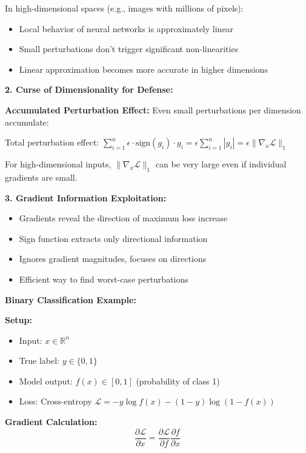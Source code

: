 \documentclass[12pt]{article}
\begin{document}
\begin{enumerate}[(a)]
{    In high-dimensional spaces (e.g., images with millions of pixels):
    \begin{itemize}
        \item Local behavior of neural networks is approximately linear
        \item Small perturbations don't trigger significant non-linearities
        \item Linear approximation becomes more accurate in higher dimensions
    \end{itemize}
    
    \textbf{2. Curse of Dimensionality for Defense:}
    
    \textbf{Accumulated Perturbation Effect:}
    Even small perturbations per dimension accumulate:
    
    Total perturbation effect: $\sum_{i=1}^n \epsilon \cdot \text{sign}(g_i) \cdot g_i = \epsilon \sum_{i=1}^n |g_i| = \epsilon \|\nabla_x \mathcal{L}\|_1$
    
    For high-dimensional inputs, $\|\nabla_x \mathcal{L}\|_1$ can be very large even if individual gradients are small.
    
    \textbf{3. Gradient Information Exploitation:}
    \begin{itemize}
        \item Gradients reveal the direction of maximum loss increase
        \item Sign function extracts only directional information
        \item Ignores gradient magnitudes, focuses on directions
        \item Efficient way to find worst-case perturbations
    \end{itemize}
    
    \textbf{Binary Classification Example:}
    
    \textbf{Setup:}
    \begin{itemize}
        \item Input: $x \in \mathbb{R}^n$
        \item True label: $y \in \{0, 1\}$
        \item Model output: $f(x) \in [0, 1]$ (probability of class 1)
        \item Loss: Cross-entropy $\mathcal{L} = -y \log f(x) - (1-y) \log(1-f(x))$
    \end{itemize}
    
    \textbf{Gradient Calculation:}
    $$\frac{\partial \mathcal{L}}{\partial x} = \frac{\partial \mathcal{L}}{\partial f} \frac{\partial f}{\partial x}$$
    
}
\end{enumerate}
\end{document}
